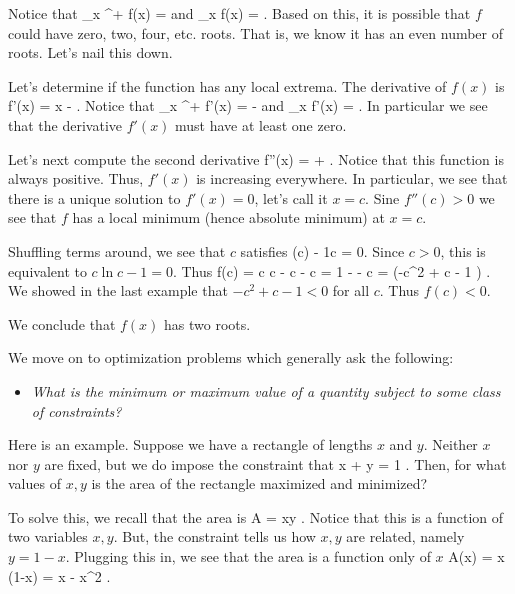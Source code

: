 \documentclass[11pt]{amsart}
\begin{document}
\newpage  

Notice that 
\beqn
\lim_{x ^+} f(x) = \infty 
\eeqn
and 
\beqn
\lim_{x \to \infty} f(x) = \infty .
\eeqn
Based on this, it is possible that $f$ could have zero, two, four, etc. roots.
That is, we know it has an even number of roots. 
Let's nail this down.

Let's determine if the function has any local extrema. 
The derivative of $f(x)$ is
\beqn
f'(x) = \ln x -  . 
\eeqn
Notice that 
\beqn
\lim_{x ^+} f'(x) = - \infty 
\eeqn
and 
\beqn
\lim_{x \to \infty} f'(x) = \infty .
\eeqn
In particular we see that the derivative $f'(x)$ must have at least one zero.

Let's next compute the second derivative
\beqn
f''(x) =  +  .
\eeqn
Notice that this function is always positive. 
Thus, $f'(x)$ is increasing everywhere.
In particular, we see that there is a unique solution to $f'(x) = 0$, let's call it $x = c$. 
Sine $f''(c) > 0$ we see that $f$ has a local minimum (hence absolute minimum) at $x=c$. 

Shuffling terms around, we see that $c$ satisfies
\beqn
\ln(c) - \frac1c = 0.
\eeqn
Since $c > 0$, this is equivalent to $c \ln c - 1 = 0$. 
Thus
\beqn
f(c) = c \ln c - \ln c - c = 1 -  - c =  \left(-c^2 + c - 1 \right) .
\eeqn
We showed in the last example that $-c^2 + c - 1 < 0$ for all $c$. 
Thus $f(c) < 0$.

We conclude that $f(x)$ has two roots.


\newpage

We move on to optimization problems which generally ask the following:
\begin{itemize}
\item \textit{What is the minimum or maximum value of a quantity subject to some class of constraints?}
\end{itemize} 

Here is an example. 
Suppose we have a rectangle of lengths $x$ and $y$.
Neither $x$ nor $y$ are fixed, but we do impose the constraint that
\beqn
x + y = 1 .
\eeqn
Then, for what values of $x,y$ is the area of the rectangle maximized and minimized? 

To solve this, we recall that the area is
\beqn
A = xy .
\eeqn
Notice that this is a function of two variables $x,y$. 
But, the constraint tells us how $x,y$ are related, namely $y = 1-x$. 
Plugging this in, we see that the area is a function only of $x$
\beqn
A(x) = x (1-x) = x - x^2 .
\eeqn
\end{document}
